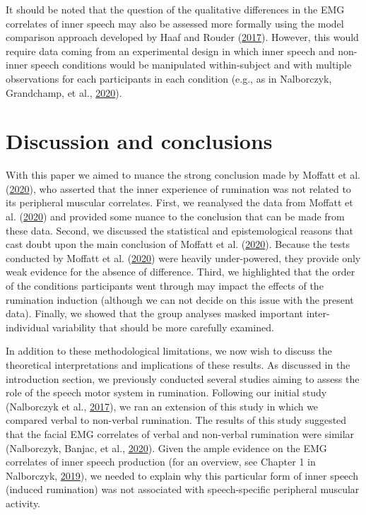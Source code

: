 \documentclass[
  english,
  man, donotrepeattitle,floatsintext]{apa6}
\begin{document}
It should be noted that the question of the qualitative differences in the EMG correlates of inner speech may also be assessed more formally using the model comparison approach developed by Haaf and Rouder (\protect\hyperlink{ref-haaf_developing_2017}{2017}). However, this would require data coming from an experimental design in which inner speech and non-inner speech conditions would be manipulated within-subject and with multiple observations for each participants in each condition (e.g., as in Nalborczyk, Grandchamp, et al., \protect\hyperlink{ref-nalborczyk_can_2020}{2020}).

\hypertarget{discussion-and-conclusions}{%
\section{Discussion and conclusions}\label{discussion-and-conclusions}}

With this paper we aimed to nuance the strong conclusion made by Moffatt et al. (\protect\hyperlink{ref-moffatt_inner_2020}{2020}), who asserted that the inner experience of rumination was not related to its peripheral muscular correlates. First, we reanalysed the data from Moffatt et al. (\protect\hyperlink{ref-moffatt_inner_2020}{2020}) and provided some nuance to the conclusion that can be made from these data. Second, we discussed the statistical and epistemological reasons that cast doubt upon the main conclusion of Moffatt et al. (\protect\hyperlink{ref-moffatt_inner_2020}{2020}). Because the tests conducted by Moffatt et al. (\protect\hyperlink{ref-moffatt_inner_2020}{2020}) were heavily under-powered, they provide only weak evidence for the absence of difference. Third, we highlighted that the order of the conditions participants went through may impact the effects of the rumination induction (although we can not decide on this issue with the present data). Finally, we showed that the group analyses masked important inter-individual variability that should be more carefully examined.

In addition to these methodological limitations, we now wish to discuss the theoretical interpretations and implications of these results. As discussed in the introduction section, we previously conducted several studies aiming to assess the role of the speech motor system in rumination. Following our initial study (Nalborczyk et al., \protect\hyperlink{ref-nalborczyk_orofacial_2017}{2017}), we ran an extension of this study in which we compared verbal to non-verbal rumination. The results of this study suggested that the facial EMG correlates of verbal and non-verbal rumination were similar (Nalborczyk, Banjac, et al., \protect\hyperlink{ref-nalborczyk_dissociating_2020}{2020}). Given the ample evidence on the EMG correlates of inner speech production (for an overview, see Chapter 1 in Nalborczyk, \protect\hyperlink{ref-nalborczyk_understanding_2019}{2019}), we needed to explain why this particular form of inner speech (induced rumination) was not associated with speech-specific peripheral muscular activity.
\end{document}
